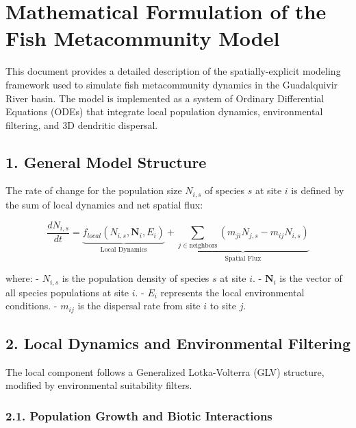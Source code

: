 \hypertarget{mathematical-formulation-of-the-fish-metacommunity-model}{%
\section{Mathematical Formulation of the Fish Metacommunity
Model}\label{mathematical-formulation-of-the-fish-metacommunity-model}}

This document provides a detailed description of the spatially-explicit
modeling framework used to simulate fish metacommunity dynamics in the
Guadalquivir River basin. The model is implemented as a system of
Ordinary Differential Equations (ODEs) that integrate local population
dynamics, environmental filtering, and 3D dendritic dispersal.

\hypertarget{general-model-structure}{%
\subsection{1. General Model Structure}\label{general-model-structure}}

The rate of change for the population size \(N_{i,s}\) of species \(s\)
at site \(i\) is defined by the sum of local dynamics and net spatial
flux:

\[\frac{dN_{i,s}}{dt} = \underbrace{f_{local}(N_{i,s}, \mathbf{N}_i, E_i)}_{\text{Local Dynamics}} + \underbrace{\sum_{j \in \text{neighbors}} (m_{ji} N_{j,s} - m_{ij} N_{i,s})}_{\text{Spatial Flux}}\]

where: - \(N_{i,s}\) is the population density of species \(s\) at site
\(i\). - \(\mathbf{N}_i\) is the vector of all species populations at
site \(i\). - \(E_i\) represents the local environmental conditions. -
\(m_{ij}\) is the dispersal rate from site \(i\) to site \(j\).

\hypertarget{local-dynamics-and-environmental-filtering}{%
\subsection{2. Local Dynamics and Environmental
Filtering}\label{local-dynamics-and-environmental-filtering}}

The local component follows a Generalized Lotka-Volterra (GLV)
structure, modified by environmental suitability filters.

\hypertarget{population-growth-and-biotic-interactions}{%
\subsubsection{2.1. Population Growth and Biotic
Interactions}\label{population-growth-and-biotic-interactions}}

